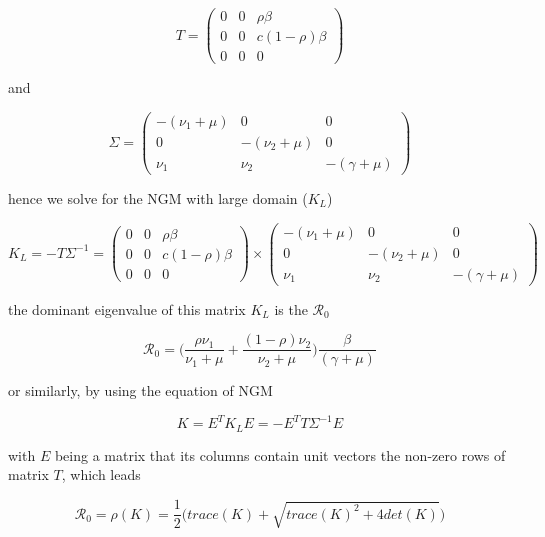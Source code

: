 \documentclass[12pt]{article}
\begin{document}
\begin{equation*}
T=
\begin{pmatrix}
0 & 0 & \rho \beta\\
0 & 0 & c (1-\rho)\beta\\
0 & 0 & 0
\end{pmatrix}
\end{equation*}

and 

\begin{equation*}
\Sigma=
\begin{pmatrix}
-(\nu_{1}+\mu) & 0 & 0\\
0 & -(\nu_{2}+\mu) & 0\\
\nu_{1} &  \nu_{2}& -(\gamma + \mu)
\end{pmatrix}
\end{equation*}

hence we solve for the NGM with large domain ($K_{L}$)

\begin{equation*}
K_{L} = -T\Sigma^{-1} = 
\begin{pmatrix}
0 & 0 & \rho \beta\\
0 & 0 & c (1-\rho)\beta\\
0 & 0 & 0
\end{pmatrix}
\times
\begin{pmatrix}
-(\nu_{1}+\mu) & 0 & 0\\
0 & -(\nu_{2}+\mu) & 0\\
\nu_{1} &  \nu_{2}& -(\gamma + \mu)
\end{pmatrix}
\end{equation*}

the dominant eigenvalue of this matrix $K_{L}$ is the $\mathcal{R_{0}}$

\begin{equation}
\mathcal{R}_{0} = \bigg( \frac{\rho \nu_{1}}{\nu_{1} + \mu} + \frac{(1-\rho) \nu_{2}}{\nu_{2} + \mu}  \bigg) \frac{\beta}{(\gamma + \mu)}
\end{equation}

or similarly, by using the equation of NGM

\begin{equation}
K=E^{T}K_{L}E=-E^{T}T\Sigma^{-1}E
\end{equation}

with $E$ being a matrix that its columns contain unit vectors the non-zero rows of matrix $T$, which leads

\begin{equation}
\mathcal{R}_{0}  = \rho (K) = \frac{1}{2} \bigg( trace(K) + \sqrt{trace(K)^{2} + 4det(K)} \bigg)
\label{eq:8}
\end{equation}
\end{document}
